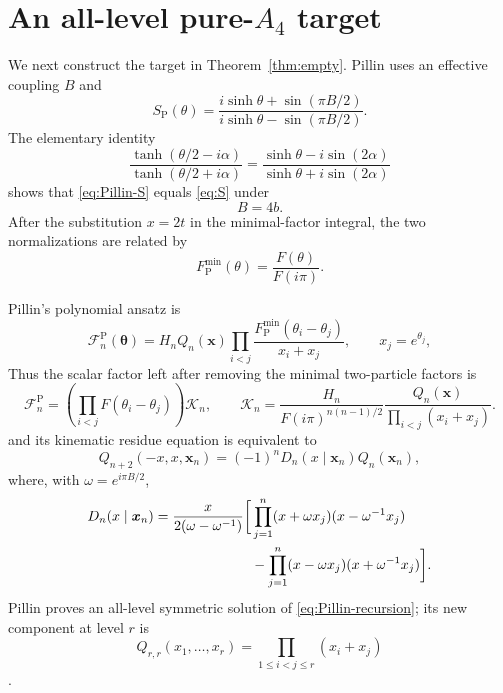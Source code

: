 \documentclass[11pt,reqno]{amsart}
\theoremstyle{definition}
\theoremstyle{remark}
\newcommand{\cK}{\mathcal K}
\begin{document}
\section{An all-level pure-\texorpdfstring{$A_4$}{A4} target}
\label{sec:target}

We next construct the target in Theorem~\ref{thm:empty}.  Pillin uses an
effective coupling $B$ and
\begin{equation}
 S_{\mathrm P}(\theta)
 =\frac{i\sinh\theta+\sin(\pi B/2)}
 {i\sinh\theta-\sin(\pi B/2)}.
 \label{eq:Pillin-S}
\end{equation}
The elementary identity
\begin{equation}
 \frac{\tanh(\theta/2-i\alpha)}
 {\tanh(\theta/2+i\alpha)}
 =\frac{\sinh\theta-i\sin(2\alpha)}
 {\sinh\theta+i\sin(2\alpha)}
 \label{eq:tanh-identity}
\end{equation}
shows that \eqref{eq:Pillin-S} equals \eqref{eq:S} under
\begin{equation}
 B=4b.
 \label{eq:B-map}
\end{equation}
After the substitution $x=2t$ in the minimal-factor integral, the two
normalizations are related by
\begin{equation}
 F^{\min}_{\mathrm P}(\theta)=\frac{F(\theta)}{F(i\pi)}.
 \label{eq:F-map}
\end{equation}

Pillin's polynomial ansatz is
\begin{equation}
 \mathcal F_n^{\mathrm P}(\boldsymbol\theta)
 =H_nQ_n(\boldsymbol x)
 \prod_{i<j}\frac{F^{\min}_{\mathrm P}(\theta_i-\theta_j)}
 {x_i+x_j},
 \qquad x_j=e^{\theta_j},
 \label{eq:Pillin-ansatz}
\end{equation}
Thus the scalar factor left after removing the minimal two-particle factors is
\begin{equation}
 \mathcal F_n^{\mathrm P}
 =\left(\prod_{i<j}F(\theta_i-\theta_j)\right)\cK_n,
 \qquad
 \cK_n=\frac{H_n}{F(i\pi)^{n(n-1)/2}}
 \frac{Q_n(\boldsymbol x)}{\prod_{i<j}(x_i+x_j)}.
 \label{eq:Pillin-to-K}
\end{equation}
and its kinematic residue equation is equivalent to
\begin{equation}
 Q_{n+2}(-x,x,\boldsymbol x_n)
 =(-1)^nD_n(x\mid\boldsymbol x_n)Q_n(\boldsymbol x_n),
 \label{eq:Pillin-recursion}
\end{equation}
where, with $\omega=e^{i\pi B/2}$,
\begin{align}
 D_n(x\mid\boldsymbol x_n)
 =\frac{x}{2(\omega-\omega^{-1})}
 \bigg[&\prod_{j=1}^n(x+\omega x_j)(x-\omega^{-1}x_j)
 \notag\\
 &-\prod_{j=1}^n(x-\omega x_j)(x+\omega^{-1}x_j)\bigg].
 \label{eq:Dn}
\end{align}
Pillin proves an all-level symmetric solution of
\eqref{eq:Pillin-recursion}; its new component at level $r$ is
\begin{equation}
 Q_{r,r}(x_1,\ldots,x_r)=\prod_{1\le i<j\le r}(x_i+x_j)
 \label{eq:Pillin-kernel}
\end{equation}
\cite[Eqs.~(15), (19)]{Pillin_1998sg}.
\end{document}
